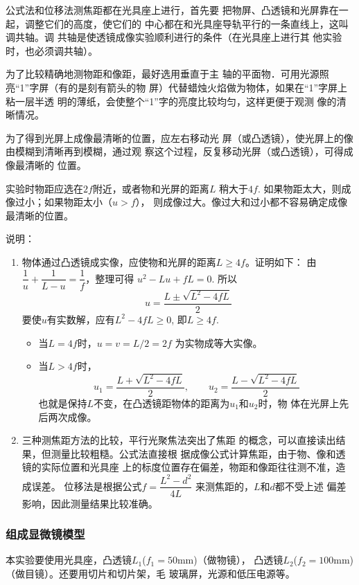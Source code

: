公式法和位移法测焦距都在光具座上进行，首先要
把物屏、凸透镜和光屏靠在一起，调整它们的高度，使它们的
中心都在和光具座导轨平行的一条直线上，这叫调共轴。调
共轴是使透镜成像实验顺利进行的条件（在光具座上进行其
他实验时，也必须调共轴）。

为了比较精确地测物距和像距，最好选用垂直于主
轴的平面物．可用光源照亮“1”字屏（有的是刻有箭头的物
屏）代替蜡烛火焰做为物体，如果在“1”字屏上粘一层半透
明的薄纸，会使整个“1”字的亮度比较均匀，这样更便于观测
像的清晰情况。

为了得到光屏上成像最清晰的位置，应左右移动光
屏（或凸透镜），使光屏上的像由模糊到清晰再到模糊，通过观
察这个过程，反复移动光屏（或凸透镜），可得成像最清晰的
位置。

实验时物距应选在$2f$附近，或者物和光屏的距离$L$
稍大于$4f$. 如果物距太大，则成像过小；如果物距太小（$u>f$），
则成像过大。像过大和过小都不容易确定成像最清晰的位置。

说明：
\begin{enumerate}
    \item 物体通过凸透镜成实像，应使物和光屏的距离$L\ge 4f$。证明如下：
    由$\dfrac{1}{u}+\dfrac{1}{L-u}=\dfrac{1}{f}$，整理可得
    $u^2-Lu+fL=0$.
所以
\[u=\frac{L\pm\sqrt{L^2-4fL}}{2}\]    
要使$u$有实数解，应有$L^2-4fL\ge 0$, 即$L\ge 4f$.
\begin{itemize}
    \item 当$L=4f$时，$u=v=L/2=2f$
    为实物成等大实像。
    \item 当$L>4f$时，
    \[u_1=\frac{L+\sqrt{L^2-4fL}}{2},\qquad u_2=\frac{L-\sqrt{L^2-4fL}}{2}\]
    也就是保持$L$不变，在凸透镜距物体的距离为$u_1$和$u_2$时，物
    体在光屏上先后两次成像。
\end{itemize}

\item 三种测焦距方法的比较，平行光聚焦法突出了焦距
的概念，可以直接读出结果，但测量比较粗糙。公式法直接根
据成像公式计算焦距，由于物、像和透镜的实际位置和光具座
上的标度位置存在偏差，物距和像距往往测不准，造成误差。
位移法是根据公式$f=\dfrac{L^2-d^2}{4L}$
来测焦距的，$L$和$d$都不受上述
偏差影响，因此测量结果比较准确。
\end{enumerate}

\subsubsection{组成显微镜模型}
本实验要使用光具座，凸透镜$L_1$($f_1=50$mm)（做物镜），
凸透镜$L_2$($f_2=100$mm)（做目镜）。还要用切片和切片架，毛
玻璃屏，光源和低压电源等。

